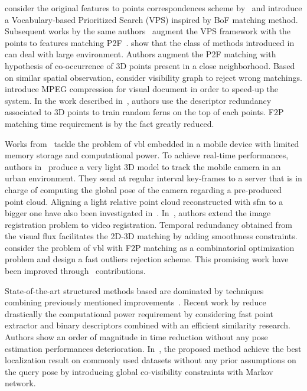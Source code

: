 \citet{Sattler2011} consider the original features to points correspondences scheme by~\citep{Irschara2009} and introduce a Vocabulary-based Prioritized Search (VPS) inspired by BoF matching method. Subsequent works by the same authors~\citep{Sattler2012} augment the VPS framework with the points to features matching P2F~\citep{Li2010}. \citet{Li2012} show that the class of methods introduced in~\citep{Irschara2009,Li2010} can deal with large environment. Authors augment the P2F matching with hypothesis of co-occurrence of 3D points present in a close neighborhood. Based on similar spatial observation, \citet{Sattler2015} consider visibility graph to reject wrong matchings. \citet{Heisterklaus2014} introduce MPEG compression for visual document in order to speed-up the system. In the work described in~\citep{Donoser2014}, authors use the descriptor redundancy associated to 3D points to train random ferns on the top of each points. F2P matching time requirement is by the fact greatly reduced. 

Works from~\citep{Middelberg2014,Lynen2015} tackle the problem of \ac{vbl} embedded in a mobile device with limited memory storage and computational power. To achieve real-time performances, authors in~\citep{Middelberg2014} produce a very light 3D model to track the mobile camera in an urban environment. They send at regular interval key-frames to a server that is in charge of computing the global pose of the camera regarding a pre-produced point cloud. Aligning a light relative point cloud reconstructed with \ac{sfm} to a bigger one have also been investigated in~\citep{Lu2015}. In~\citep{Kroeger2014}, authors extend the image registration problem to video registration. Temporal redundancy obtained from the visual flux facilitates the 2D-3D matching by adding smoothness constraints. \citet{Svarm2014} consider the problem of \ac{vbl} with F2P matching as a combinatorial optimization problem and design a fast outliers rejection scheme. This promising work have been improved through~\citep{Zeisl2015,Svarm2016} contributions.

State-of-the-art structured methods based are dominated by techniques combining previously mentioned improvements~\citep{Sattler2016a}. Recent work by \citet{Feng2016a} reduce drastically the computational power requirement by considering fast point extractor and binary descriptors combined with an efficient similarity research. Authors show an order of magnitude in time reduction without any pose estimation performances deterioration. In~\citep{Liu2017a}, the proposed method achieve the best localization result on commonly used datasets without any prior assumptions on the query pose by introducing global co-visibility constraints with Markov network.

